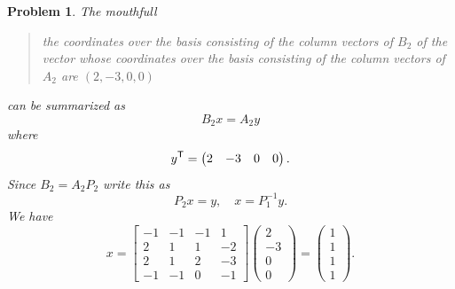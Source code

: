 \documentclass{article}
\theoremstyle{pprop}
\newtheorem{problem}{Problem}[section]
\begin{document}
\begin{problem}
The mouthfull 
\begin{quote}
  the coordinates over the basis consisting of the column vectors of $B_2$ of the vector whose coordinates over the basis 
  consisting of the column vectors of $A_2$ are $(2,-3, 0, 0)$
\end{quote}
can be summarized as 
$$
B_2 x =A_2 y 
$$
where 
$$
y^{\sf T}=\begin{pmatrix} 2 & -3 & 0 &0 \end{pmatrix}.
$$
Since $B_2=A_2P_2$ write this as
$$
P_2 x = y, \quad x = P_1^{-1} y.
$$
We have 
$$
x=\begin{bmatrix}
-1 & -1 & -1 & 1 \\
2 & 1 & 1 & -2 \\
2 & 1 & 2 & -3 \\
-1 & -1 & 0 & -1
\end{bmatrix}
\begin{pmatrix}
2 \\ -3 \\ 0 \\0 
\end{pmatrix}=
\begin{pmatrix}
1 \\ 1 \\1 \\1 
\end{pmatrix}.
$$
\end{problem}
\end{document}
